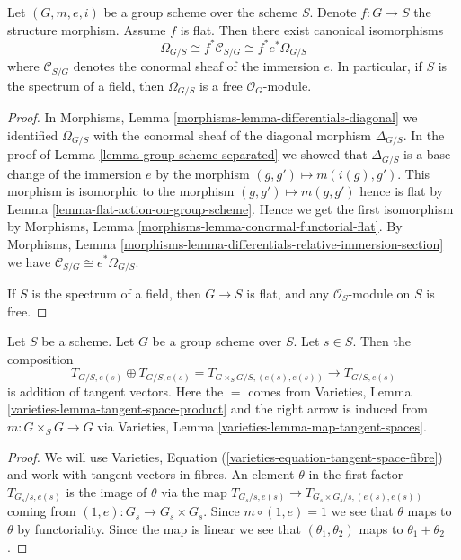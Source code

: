 \begin{lemma}
\label{lemma-group-scheme-module-differentials}
Let $(G, m, e, i)$ be a group scheme over the scheme $S$.
Denote $f : G \to S$ the structure morphism. Assume $f$ is flat.
Then there exist canonical isomorphisms
$$
\Omega_{G/S} \cong f^*\mathcal{C}_{S/G} \cong f^*e^*\Omega_{G/S}
$$
where $\mathcal{C}_{S/G}$ denotes the conormal sheaf of the
immersion $e$. In particular, if $S$ is the spectrum of a field, then
$\Omega_{G/S}$ is a free $\mathcal{O}_G$-module.
\end{lemma}

\begin{proof}
In
Morphisms, Lemma \ref{morphisms-lemma-differentials-diagonal}
we identified $\Omega_{G/S}$ with the conormal sheaf of the
diagonal morphism $\Delta_{G/S}$. In the proof of
Lemma \ref{lemma-group-scheme-separated}
we showed that $\Delta_{G/S}$ is a base change of the immersion $e$
by the morphism $(g, g') \mapsto m(i(g), g')$. This morphism
is isomorphic to the morphism $(g, g') \mapsto m(g, g')$
hence is flat by
Lemma \ref{lemma-flat-action-on-group-scheme}.
Hence we get the first isomorphism by
Morphisms, Lemma \ref{morphisms-lemma-conormal-functorial-flat}.
By
Morphisms, Lemma \ref{morphisms-lemma-differentials-relative-immersion-section}
we have $\mathcal{C}_{S/G} \cong e^*\Omega_{G/S}$.

\medskip\noindent
If $S$ is the spectrum of a field, then $G \to S$ is flat, and
any $\mathcal{O}_S$-module on $S$ is free.
\end{proof}

\begin{lemma}
\label{lemma-group-scheme-addition-tangent-vectors}
Let $S$ be a scheme. Let $G$ be a group scheme over $S$.
Let $s \in S$. Then the composition
$$
T_{G/S, e(s)} \oplus T_{G/S, e(s)} = T_{G \times_S G/S, (e(s), e(s))}
\rightarrow T_{G/S, e(s)}
$$
is addition of tangent vectors. Here the $=$ comes from
Varieties, Lemma \ref{varieties-lemma-tangent-space-product}
and the right arrow is induced from $m : G \times_S G \to G$ via
Varieties, Lemma \ref{varieties-lemma-map-tangent-spaces}.
\end{lemma}

\begin{proof}
We will use Varieties, Equation (\ref{varieties-equation-tangent-space-fibre})
and work with tangent vectors in fibres.
An element $\theta$ in the first factor $T_{G_s/s, e(s)}$
is the image of $\theta$ via the map
$T_{G_s/s, e(s)} \to T_{G_s \times G_s/s, (e(s), e(s))}$
coming from $(1, e) : G_s \to G_s \times G_s$.
Since $m \circ (1, e) = 1$ we see that $\theta$ maps to $\theta$
by functoriality. Since the map is linear we see that
$(\theta_1, \theta_2)$ maps to $\theta_1 + \theta_2$.
\end{proof}





